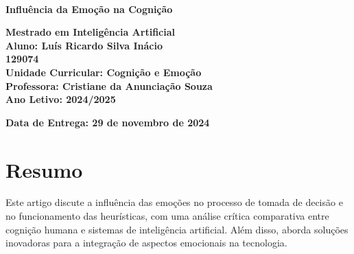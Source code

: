 \documentclass[a4paper,12pt]{report}
\begin{document}
	
	\begin{titlepage}
		\centering
		\hfill%
		\\[1cm]
		\vspace{1cm}
		{\LARGE \textbf{Influência da Emoção na Cognição} \par}
		\vspace{1cm}
		\textbf{Mestrado em Inteligência Artificial} \\
		\vspace{2cm}
		\textbf{Aluno: Luís Ricardo Silva Inácio} \\
		\textbf{129074} \\
		\vspace{1cm}
		\textbf{Unidade Curricular: Cognição e Emoção} \\
		\vspace{1cm}
		\textbf{Professora: Cristiane da Anunciação Souza} \\
		\vfill
		\textbf{Ano Letivo: 2024/2025} \par
		\vfill
		\textbf{Data de Entrega: 29 de novembro de 2024} \par
	\end{titlepage}
	
	\newpage
	\thispagestyle{empty}
	\mbox{}
	\newpage
	
	
	\section*{Resumo}
	Este artigo discute a influência das emoções no processo de tomada de decisão e no funcionamento das heurísticas, com uma análise crítica comparativa entre cognição humana e sistemas de inteligência artificial. Além disso, aborda soluções inovadoras para a integração de aspectos emocionais na tecnologia.
	
\end{document}

